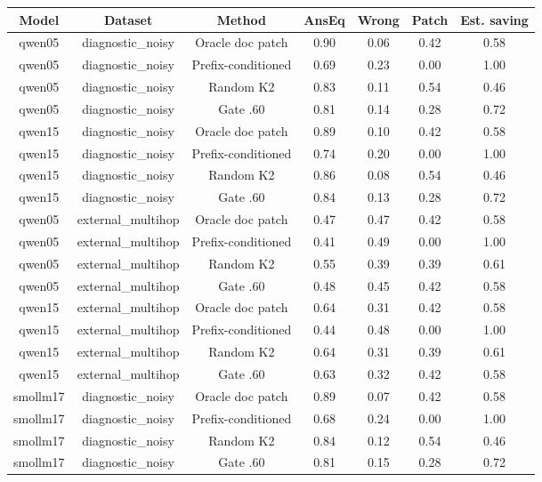 \begin{table}[t]
\centering
\footnotesize
\begin{adjustbox}{max width=\textwidth}
\begin{tabular}{ccccccc}
\toprule
Model & Dataset & Method & AnsEq & Wrong & Patch & Est. saving \\
\midrule
qwen05 & diagnostic\_noisy & Oracle doc patch & 0.90 & 0.06 & 0.42 & 0.58 \\
qwen05 & diagnostic\_noisy & Prefix-conditioned & 0.69 & 0.23 & 0.00 & 1.00 \\
qwen05 & diagnostic\_noisy & Random K2 & 0.83 & 0.11 & 0.54 & 0.46 \\
qwen05 & diagnostic\_noisy & Gate .60 & 0.81 & 0.14 & 0.28 & 0.72 \\
qwen15 & diagnostic\_noisy & Oracle doc patch & 0.89 & 0.10 & 0.42 & 0.58 \\
qwen15 & diagnostic\_noisy & Prefix-conditioned & 0.74 & 0.20 & 0.00 & 1.00 \\
qwen15 & diagnostic\_noisy & Random K2 & 0.86 & 0.08 & 0.54 & 0.46 \\
qwen15 & diagnostic\_noisy & Gate .60 & 0.84 & 0.13 & 0.28 & 0.72 \\
qwen05 & external\_multihop & Oracle doc patch & 0.47 & 0.47 & 0.42 & 0.58 \\
qwen05 & external\_multihop & Prefix-conditioned & 0.41 & 0.49 & 0.00 & 1.00 \\
qwen05 & external\_multihop & Random K2 & 0.55 & 0.39 & 0.39 & 0.61 \\
qwen05 & external\_multihop & Gate .60 & 0.48 & 0.45 & 0.42 & 0.58 \\
qwen15 & external\_multihop & Oracle doc patch & 0.64 & 0.31 & 0.42 & 0.58 \\
qwen15 & external\_multihop & Prefix-conditioned & 0.44 & 0.48 & 0.00 & 1.00 \\
qwen15 & external\_multihop & Random K2 & 0.64 & 0.31 & 0.39 & 0.61 \\
qwen15 & external\_multihop & Gate .60 & 0.63 & 0.32 & 0.42 & 0.58 \\
smollm17 & diagnostic\_noisy & Oracle doc patch & 0.89 & 0.07 & 0.42 & 0.58 \\
smollm17 & diagnostic\_noisy & Prefix-conditioned & 0.68 & 0.24 & 0.00 & 1.00 \\
smollm17 & diagnostic\_noisy & Random K2 & 0.84 & 0.12 & 0.54 & 0.46 \\
smollm17 & diagnostic\_noisy & Gate .60 & 0.81 & 0.15 & 0.28 & 0.72 \\

\end{tabular}
\end{adjustbox}
\end{table}
